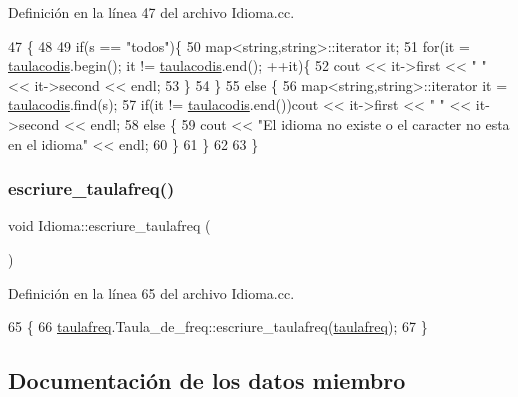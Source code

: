 Definición en la línea 47 del archivo Idioma.\+cc.


\begin{DoxyCode}
47                                          \{
48     
49     \textcolor{keywordflow}{if}(s == \textcolor{stringliteral}{"todos"})\{
50         map<string,string>::iterator it;
51         \textcolor{keywordflow}{for}(it = \hyperlink{class_idioma_a8eb4228a5182a71efe31c110f2500723}{taulacodis}.begin(); it != \hyperlink{class_idioma_a8eb4228a5182a71efe31c110f2500723}{taulacodis}.end(); ++it)\{
52             cout << it->first << \textcolor{stringliteral}{" "} << it->second << endl;
53         \}
54     \}
55     \textcolor{keywordflow}{else} \{
56         map<string,string>::iterator it = \hyperlink{class_idioma_a8eb4228a5182a71efe31c110f2500723}{taulacodis}.find(s);
57         \textcolor{keywordflow}{if}(it != \hyperlink{class_idioma_a8eb4228a5182a71efe31c110f2500723}{taulacodis}.end())cout << it->first << \textcolor{stringliteral}{" "} << it->second << endl;
58         \textcolor{keywordflow}{else} \{
59             cout << \textcolor{stringliteral}{"El idioma no existe o el caracter no esta en el idioma"} << endl;
60         \}
61     \}
62         
63 \}
\end{DoxyCode}
\mbox{\label{class_idioma_abb8d57bbf17437c67cf3860643e60386}} 
\subsubsection{\texorpdfstring{escriure\+\_\+taulafreq()}{escriure\_taulafreq()}}
{\footnotesize\ttfamily void Idioma\+::escriure\+\_\+taulafreq (\begin{DoxyParamCaption}{ }\end{DoxyParamCaption})}



Definición en la línea 65 del archivo Idioma.\+cc.


\begin{DoxyCode}
65                                \{
66     \hyperlink{class_idioma_a51e5f7366342e04f3dae8a4f0fdcca60}{taulafreq}.Taula\_de\_freq::escriure\_taulafreq(\hyperlink{class_idioma_a51e5f7366342e04f3dae8a4f0fdcca60}{taulafreq});
67 \}
\end{DoxyCode}


\subsection{Documentación de los datos miembro}
\mbox{\label{class_idioma_a4f95caa662042f1404ab10319b50ee56}} 
